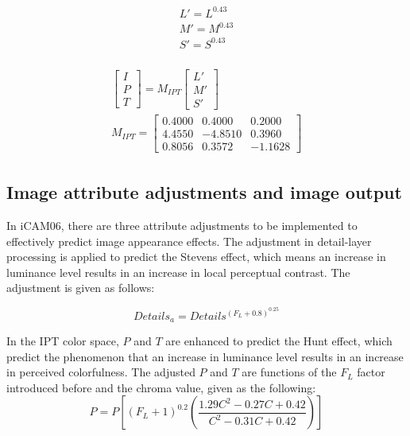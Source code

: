 \documentclass[10pt,twocolumn,letterpaper]{article}
\begin{document}
\begin{align}
\begin{aligned}
	L'=L^{0.43}\\
	M'=M^{0.43}\\
	S'=S^{0.43}
\end{aligned}
\end{align}

\begin{align}
\begin{aligned}
	\left[
		\begin{array}{c}
		I\\
		P\\
		T
		\end{array}
	\right]
	= M_{IPT}
	\left[
		\begin{array}{c}
		L'\\
		M'\\
		S'
		\end{array}
	\right]\\
	M_{IPT} = 
	\left[
		\begin{array}{ccc}
		0.4000&0.4000&0.2000\\
		4.4550&-4.8510&0.3960\\
		0.8056&0.3572&-1.1628
		\end{array}
	\right]
\end{aligned}
\end{align}


\subsection{Image attribute adjustments and image output}
\label{sec:partf}
In iCAM06, there are three attribute adjustments to be implemented to effectively predict image appearance effects. The adjustment in detail-layer processing is applied to predict the Stevens effect, which means an increase in luminance level results in an increase in local perceptual contrast. The adjustment is given as follows:

\begin{equation}
	Details_a = Details^{(F_L+0.8)^{0.25}}
\end{equation}

In the IPT color space, $P$ and $T$ are enhanced to predict the Hunt effect, which predict the phenomenon that an increase in luminance level results in an increase in perceived colorfulness. The adjusted $P$ and $T$ are functions of the $F_L$ factor introduced before and the chroma value, given as the following:
\begin{equation}
	P=P[(F_L+1)^{0.2}(\frac{1.29C^2-0.27C+0.42}{C^2-0.31C+0.42})]
\end{equation}
\end{document}
